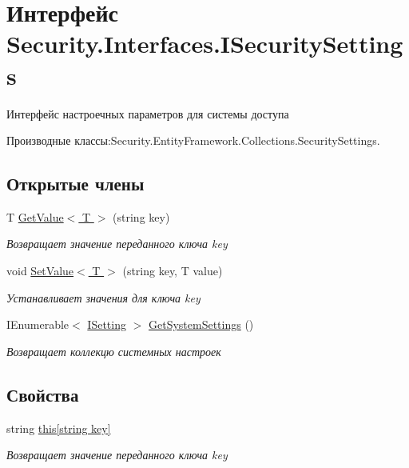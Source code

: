 \hypertarget{interface_security_1_1_interfaces_1_1_i_security_settings}{}\section{Интерфейс Security.\+Interfaces.\+I\+Security\+Settings}
\label{interface_security_1_1_interfaces_1_1_i_security_settings}


Интерфейс настроечных параметров для системы доступа  




Производные классы\+:Security.\+Entity\+Framework.\+Collections.\+Security\+Settings.

\subsection*{Открытые члены}
\begin{DoxyCompactItemize}
\item 
T \hyperlink{interface_security_1_1_interfaces_1_1_i_security_settings_a78c883e86e5d04af4fa4f4e4c628f54f}{Get\+Value$<$ T $>$} (string key)
\begin{DoxyCompactList}\small\item\em Возвращает значение переданного ключа key \end{DoxyCompactList}\item 
void \hyperlink{interface_security_1_1_interfaces_1_1_i_security_settings_a3766f2cc07be69229f3b170f6e8207c9}{Set\+Value$<$ T $>$} (string key, T value)
\begin{DoxyCompactList}\small\item\em Устанавливает значения для ключа key \end{DoxyCompactList}\item 
I\+Enumerable$<$ \hyperlink{interface_security_1_1_interfaces_1_1_model_1_1_i_setting}{I\+Setting} $>$ \hyperlink{interface_security_1_1_interfaces_1_1_i_security_settings_ae613aa8909bd26a80e39c9b6d19e455f}{Get\+System\+Settings} ()
\begin{DoxyCompactList}\small\item\em Возвращает коллекцю системных настроек \end{DoxyCompactList}\end{DoxyCompactItemize}
\subsection*{Свойства}
\begin{DoxyCompactItemize}
\item 
string \hyperlink{interface_security_1_1_interfaces_1_1_i_security_settings_a9ae734614fb951b533f4cb6bcc83cd0b}{this\mbox{[}string key\mbox{]}}
\begin{DoxyCompactList}\small\item\em Возвращает значение переданного ключа key \end{DoxyCompactList}\end{DoxyCompactItemize}


